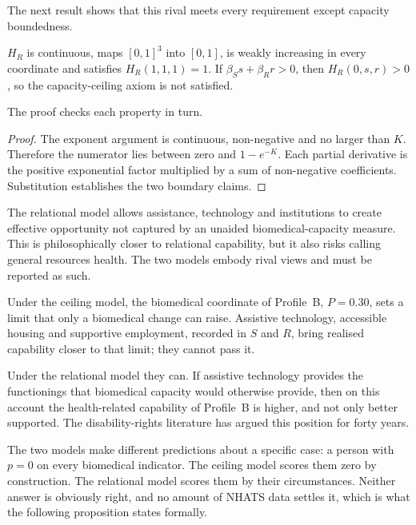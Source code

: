 The next result shows that this rival meets every requirement except capacity
boundedness.

\begin{proposition}
$H_R$ is continuous, maps $[0,1]^3$ into $[0,1]$, is weakly increasing in every
coordinate and satisfies $H_R(1,1,1)=1$. If
$\beta_Ss+\beta_Rr>0$, then $H_R(0,s,r)>0$, so the capacity-ceiling axiom is
not satisfied.
\end{proposition}
The proof checks each property in turn.
\begin{proof}
The exponent argument is continuous, non-negative and no larger than $K$.
Therefore the numerator lies between zero and $1-e^{-K}$. Each partial
derivative is the positive exponential factor multiplied by a sum of
non-negative coefficients. Substitution establishes the two boundary claims.
\end{proof}

\begin{remark}
The relational model allows assistance, technology and institutions to create
effective opportunity not captured by an unaided biomedical-capacity measure.
This is philosophically closer to relational capability, but it also risks
calling general resources health. The two models embody rival views and must be
reported as such.
\end{remark}

\begin{reading}
Under the ceiling model, the biomedical coordinate of Profile~B, $P=0.30$, sets
a limit that only a biomedical change can raise. Assistive technology,
accessible housing and supportive employment, recorded in $S$ and $R$, bring
realised capability closer to that limit; they cannot pass it.

Under the relational model they can. If assistive technology provides the
functionings that biomedical capacity would otherwise provide, then on this
account the health-related capability of Profile~B is higher, and not only
better supported. The disability-rights literature has argued this position for
forty years.

The two models make different predictions about a specific case: a person with
$p=0$ on every biomedical indicator. The ceiling model scores them zero by
construction. The relational model scores them by their circumstances. Neither
answer is obviously right, and no amount of NHATS data settles it, which is
what the following proposition states formally.
\end{reading}

